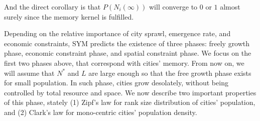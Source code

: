 \documentclass[reprint,unsortedaddress,amsmath,amssymb,aps,prl,showkeys]{revtex4-2}
\begin{document}
And the direct corollary is that $P(N_i(\infty))$ will converge to $0$ or $1$ almost surely since the memory kernel is fulfilled. 



Depending on the relative importance of city sprawl, emergence rate, and economic constraints, SYM predicts the existence of three phases: freely growth phase, economic constraint phase, and spatial constraint phase. We focus on the first two phases above, that correspond with cities' memory. From now on, we will assume that $N^*$ and $L$ are large enough so that the free growth phase exists for small population. In such phase, cities grow desolately, without being controlled by total resource and space. We now describe two important properties of this phase, stately (1) Zipf's law\cite{gabaix1999zipf's} for rank size distribution of cities' population, and (2) Clark's law for mono-centric cities' population density. 
\end{document}

